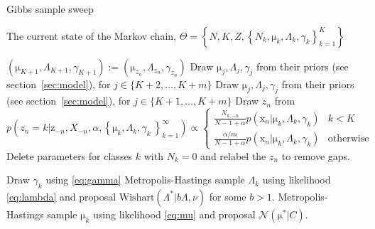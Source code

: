 \documentclass[english]{article}
\newcommand{\+}[1]{\ensuremath{\boldsymbol{\mathrm{#1}}}}
\begin{document}
\begin{algorithm}
\caption{Gibbs sample sweep}\label{alg:gibbs}
\begin{algorithmic}
\Require The current state of the Markov chain, $\Theta = \left\{ N, K, Z, \left\{ N_k, \+\mu_k, \Lambda_k, \gamma_k \right\}_{k=1}^K  \right\}$
\Statex

    \State $\left( \+\mu_{K+1}, \Lambda_{K+1}, \gamma_{K+1} \right) := \left( \+\mu_{z_n}, \Lambda_{z_n}, \gamma_{z_n} \right)$ 
    \State Draw $\+\mu_j, \Lambda_j, \gamma_j$ from their priors (see section~\ref{sec:model}), for $j \in \{K+2, \ldots, K+m\}$
  \Else
    \State Draw $\+\mu_j, \Lambda_j, \gamma_j$ from their priors (see section~\ref{sec:model}), for $j \in \{K+1, \ldots, K+m\}$
  \EndIf
  \State Draw $z_n$ from 
  \[
  p(z_{n}=k|\+{z}_{-n},X_{-n},\alpha,\left\{ \+\mu_k,\Lambda_k,\gamma_k\ \right\}_{k=1}^{\infty}) \propto \begin{cases}
  \frac{N_{k,-n}}{N-1+\alpha} p(\+x_n | \+\mu_k, \Lambda_k, \gamma_k) & k < K\\
  \frac{\alpha / m}{N-1+\alpha} p(\+x_n | \+\mu_k, \Lambda_k, \gamma_k) & \text{otherwise}
  \end{cases} \label{eq:nealalg8}
  \]
  \State Delete parameters for classes $k$ with $N_k = 0$ and relabel the $z_n$ to remove gaps.
\EndFor

  \State Draw $\gamma_k$ using \eqref{eq:gamma}
  \State Metropolis-Hastings sample $\Lambda_k$ using likelihood \eqref{eq:lambda} and proposal $\text{Wishart}(\Lambda^{*} | b \Lambda, \nu)$ for some $b > 1$.
  \State Metropolis-Hastings sample $\+\mu_k$ using likelihood \eqref{eq:mu} and proposal $\mathcal{N}( \+\mu^{*} | C )$.
\EndFor

\end{algorithmic}
\end{algorithm}
\end{document}
